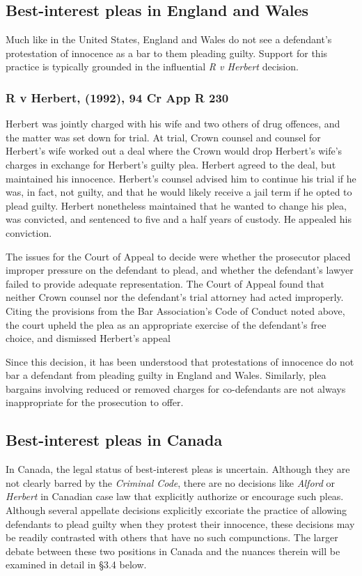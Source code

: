 \subsection{Best-interest pleas in England and Wales}

Much like in the United States, England and Wales do not see a defendant's protestation of innocence as a bar to them pleading guilty. Support for this practice is typically grounded in the influential \textit{R v Herbert} decision.

\subsubsection{R v Herbert, (1992), 94 Cr App R 230}

Herbert was jointly charged with his wife and two others of drug offences, and the matter was set down for trial. At trial, Crown counsel and counsel for Herbert's wife worked out a deal where the Crown would drop Herbert's wife's charges in exchange for Herbert's guilty plea. Herbert agreed to the deal, but maintained his innocence. Herbert's counsel advised him to continue his trial if he was, in fact, not guilty, and that he would likely receive a jail term if he opted to plead guilty. Herbert nonetheless maintained that he wanted to change his plea, was convicted, and sentenced to five and a half years of custody. He appealed his conviction.

The issues for the Court of Appeal to decide were whether the prosecutor placed improper pressure on the defendant to plead, and whether the defendant's lawyer failed to provide adequate representation. The Court of Appeal found that neither Crown counsel nor the defendant's trial attorney had acted improperly. Citing the provisions from the Bar Association's Code of Conduct noted above, the court upheld the plea as an appropriate exercise of the defendant's free choice, and dismissed Herbert's appeal

Since this decision, it has been understood that protestations of innocence do not bar a defendant from pleading guilty in England and Wales. Similarly, plea bargains involving reduced or removed charges for co-defendants are not always inappropriate for the prosecution to offer.

\subsection{Best-interest pleas in Canada}

In Canada, the legal status of best-interest pleas is uncertain. Although they are not clearly barred by the \textit{Criminal Code}, there are no decisions like \textit{Alford} or \textit{Herbert} in Canadian case law that explicitly authorize or encourage such pleas. Although several appellate decisions explicitly excoriate the practice of allowing defendants to plead guilty when they protest their innocence, these decisions may be readily contrasted with others that have no such compunctions. The larger debate between these two positions in Canada and the nuances therein will be examined in detail in §3.4 below.